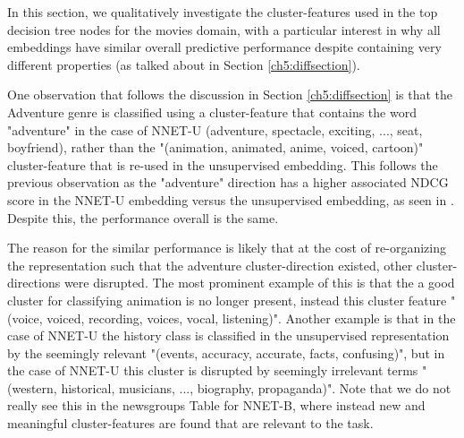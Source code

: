 In this section, we qualitatively investigate the cluster-features used in the top decision tree nodes for the movies domain, with a particular interest in why all embeddings have similar overall predictive performance despite containing very different properties (as talked about in Section \ref{ch5:diffsection}).

One observation that follows the discussion in Section \ref{ch5:diffsection} is that the Adventure genre is classified using a cluster-feature that contains the word "adventure" in the case of NNET-U (adventure, spectacle, exciting, ..., seat, boyfriend), rather than the "(animation, animated, anime, voiced, cartoon)" cluster-feature that is re-used in the unsupervised embedding. This follows the previous observation as the "adventure" direction has a higher associated NDCG score in the NNET-U embedding versus the unsupervised embedding, as seen in \label{ch5:diff}. Despite this, the performance overall is the same. 

The reason for the similar performance is likely that at the cost of re-organizing the representation such that the adventure cluster-direction existed, other cluster-directions were disrupted. The most prominent example of this is that the a good cluster for classifying animation is no longer present, instead this  cluster feature "(voice, voiced, recording, voices, vocal, listening)". Another example is that in the case of NNET-U the history class is classified in the unsupervised representation by the seemingly relevant "(events, accuracy, accurate, facts, confusing)", but in the case of NNET-U this cluster is disrupted by seemingly irrelevant terms "(western, historical, musicians, ..., biography, propaganda)". Note that we do not really see this in the newsgroups Table \label{ch5:dtng} for NNET-B, where instead new and meaningful cluster-features are found that are relevant to the task.

